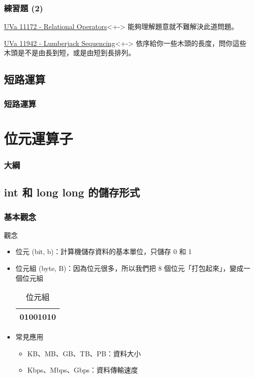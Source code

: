 \documentclass[utf8]{beamer}
\begin{document}
\begin{CJK}{UTF8}{bkai}
\begin{frame}
  \frametitle{練習題 (2)}
  \begin{exampleblock}{\href{http://unfortunate-dog.github.io/articles/111/p11172/}{UVa 11172 - Relational Operators}}<+->
  \label{uva:11172}
  能夠理解題意就不難解決此道問題。
  \end{exampleblock}
  \begin{exampleblock}{\href{http://unfortunate-dog.github.io/articles/119/p11942/}{UVa 11942 - Lumberjack Sequencing}}<+->
  \label{uva:11942}
  依序給你一些木頭的長度，問你這些木頭是不是由長到短，或是由短到長排列。
  \end{exampleblock}
\end{frame}

\subsection{短路運算}

\begin{frame}
  \frametitle{短路運算}
\end{frame}

\section{位元運算子}
\begin{frame}
  \frametitle{大綱}
  \begin{multicols}{2}
    \tableofcontents[currentsection]
  \end{multicols}
\end{frame}

\subsection{int 和 long long 的儲存形式}

\begin{frame}[fragile]
  \frametitle{基本觀念}
  \begin{exampleblock}{觀念}
    \begin{itemize}[<+->]
    \item \alert{位元} (bit, b)：計算機儲存資料的基本單位，只儲存 \alert{0 和 1}
    \item \alert{位元組} (byte, B)：因為位元很多，所以我們把 8 個位元「打包起來」，變成一個位元組
      \begin{table}[h]
        \begin{tabular}{|c|}
        \hline
        01001010\\
        \hline
        \end{tabular}
        \caption{位元組}
      \end{table}
    \item 常見應用
      \begin{itemize}[<+->]
      \item KB、MB、GB、TB、PB：資料大小
      \item Kbps、Mbps、Gbps：資料傳輸速度
      \end{itemize}
    \end{itemize}
  \end{exampleblock}
\end{frame}


\end{CJK}
\end{document}

